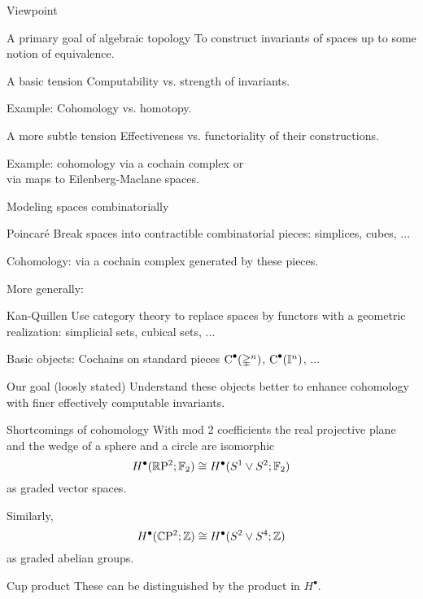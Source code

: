 
\begin{frame}{Viewpoint}
	\vskip -10pt
	\begin{block}{A primary goal of algebraic topology}
		To construct invariants of spaces up to some notion of equivalence.
	\end{block}

	\medskip\pause
	\begin{block}{A basic tension}
		Computability vs. strength of invariants.
	\end{block}

	\medskip \textcolor{pblue}{Example:}
	Cohomology vs. homotopy.

	\medskip\pause
	\begin{block}{A more subtle tension}
		Effectiveness vs. functoriality of their constructions.
	\end{block}

	\medskip \textcolor{pblue}{Example:}
	cohomology via a cochain complex or \\
	\hspace*{40pt} via maps to Eilenberg-Maclane spaces.
\end{frame}

\begin{frame}{Modeling spaces combinatorially}
	\pause
	\begin{block}{Poincar\'{e}}
		Break spaces into contractible combinatorial pieces: simplices, cubes, ...
	\end{block}

	\pause \textcolor{pblue}{Cohomology:}
	via a cochain complex generated by these pieces.

	\medskip\pause	More generally:
	\begin{block}{Kan-Quillen}
		Use category theory to replace spaces by functors with a geometric realization: simplicial sets, cubical sets, ...
	\end{block}

	\pause \textcolor{pblue}{Basic objects:}
	Cochains on standard pieces $\operatorname{C}^\bullet(\mathbb{\Delta}^n)$, $\operatorname{C}^\bullet(\mathbb{I}^n)$, ...

	\smallskip\pause
	\begin{block}{Our goal (loosly stated)}
		Understand these objects better to enhance cohomology with finer effectively computable invariants.
	\end{block}
\end{frame}

\begin{frame}{Shortcomings of cohomology}
	\pause With mod 2 coefficients the real projective plane and the wedge of a sphere and a circle are isomorphic
	\[
	H^\bullet(\mathbb{R} \mathrm{P}^2; {\mathbb{F}_2}) \cong H^\bullet(S^1 \vee S^2; {\mathbb{F}_2})
	\]
	as graded vector spaces.

	\bigskip\pause
	Similarly,
	\[
	H^\bullet(\mathbb{C} \mathrm{P}^2; \mathbb{Z}) \cong H^\bullet(S^2 \vee S^4; \mathbb{Z})
	\]
	as graded abelian groups.

	\bigskip\pause
	\begin{block}{Cup product}
		These can be distinguished by the product in $H^\bullet$.
	\end{block}
\end{frame}